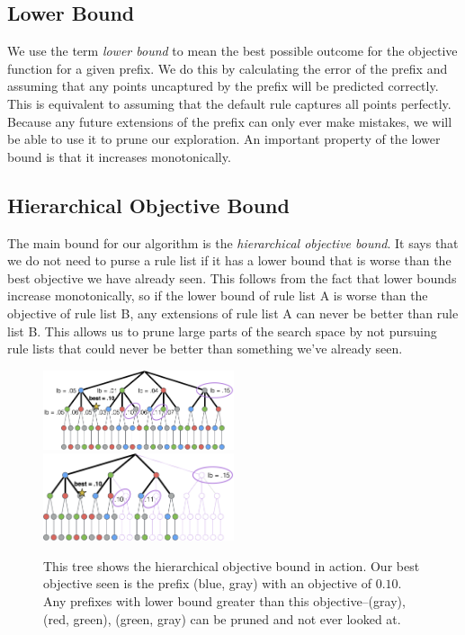 \subsection{Lower Bound}
We use the term \textit{lower bound} to mean the best possible outcome for the objective function for a given prefix.
We do this by calculating the error of the prefix and assuming that any points uncaptured by the prefix will be predicted correctly.
This is equivalent to assuming that the default rule captures all points perfectly.
Because any future extensions of the prefix can only ever make mistakes, we will be able to use it to prune our exploration.
An important property of the lower bound is that it increases monotonically.

\subsection{Hierarchical Objective Bound}
The main bound for our algorithm is the \textit{hierarchical objective bound}. 
It says that we do not need to purse a rule list if it has a lower bound that is worse than the best objective we have already seen.
This follows from the fact that lower bounds increase monotonically, so if the lower bound of rule list A is worse than the objective of rule list B, any extensions of rule list A can never be better than rule list B.
This allows us to prune large parts of the search space by not pursuing rule lists that could never be better than something we've already seen.

\begin{figure}
\includegraphics[width=0.5\textwidth]{figs/ela_branch-and-bound-tree.png}
\includegraphics[width=0.5\textwidth]{figs/ela_branch-and-bound-tree-pruned.png}
\caption[Objective bound]{This tree shows the hierarchical objective bound in action. Our best objective seen is the prefix (blue, gray) with an objective of $0.10$. Any prefixes with lower bound greater than this objective--(gray), (red, green), (green, gray) can be pruned and not ever looked at.
\label{fig:objective-bound}}
\end{figure}

